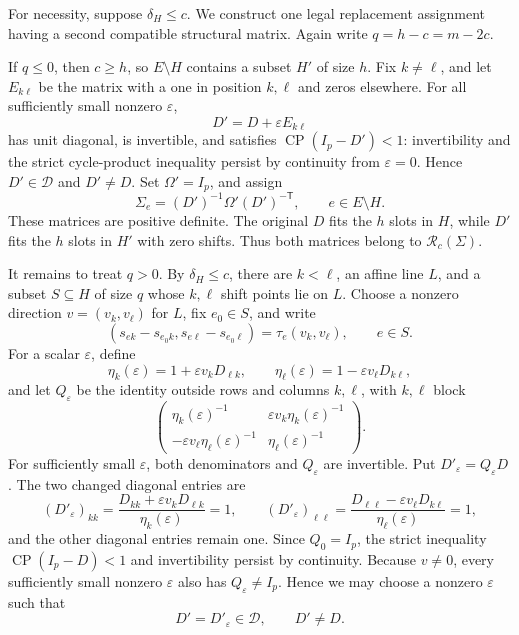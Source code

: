 For necessity, suppose \(\delta_H\le c\).  We construct one legal replacement assignment having a second compatible structural matrix.  Again write \(q=h-c=m-2c\).

If \(q\le0\), then \(c\ge h\), so \(E\setminus H\) contains a subset \(H'\) of size \(h\).  Fix \(k\ne\ell\), and let \(E_{k\ell}\) be the matrix with a one in position \(k,\ell\) and zeros elsewhere.  For all sufficiently small nonzero \(\varepsilon\),
\[
 D'=D+\varepsilon E_{k\ell}
\]
has unit diagonal, is invertible, and satisfies \(\operatorname{CP}(I_p-D')<1\): invertibility and the strict cycle-product inequality persist by continuity from \(\varepsilon=0\).  Hence \(D'\in\mathcal D\) and \(D'\ne D\).  Set \(\Omega'=I_p\), and assign
\[
 \Sigma_e=(D')^{-1}\Omega'(D')^{-\mathsf T},\qquad e\in E\setminus H.
\]
These matrices are positive definite.  The original \(D\) fits the \(h\) slots in \(H\), while \(D'\) fits the \(h\) slots in \(H'\) with zero shifts.  Thus both matrices belong to \(\mathcal R_c(\Sigma)\).

It remains to treat \(q>0\).  By \(\delta_H\le c\), there are \(k<\ell\), an affine line \(L\), and a subset \(S\subseteq H\) of size \(q\) whose \(k,\ell\) shift points lie on \(L\).  Choose a nonzero direction \(v=(v_k,v_\ell)\) for \(L\), fix \(e_0\in S\), and write
\[
 (s_{ek}-s_{e_0k},s_{e\ell}-s_{e_0\ell})=\tau_e(v_k,v_\ell),\qquad e\in S. \tag{12}
\]
For a scalar \(\varepsilon\), define
\[
 \eta_k(\varepsilon)=1+\varepsilon v_kD_{\ell k},\qquad
 \eta_\ell(\varepsilon)=1-\varepsilon v_\ell D_{k\ell},
\]
and let \(Q_\varepsilon\) be the identity outside rows and columns \(k,\ell\), with \(k,\ell\) block
\[
 \begin{pmatrix}
 \eta_k(\varepsilon)^{-1}&\varepsilon v_k\eta_k(\varepsilon)^{-1}\\
 -\varepsilon v_\ell\eta_\ell(\varepsilon)^{-1}&\eta_\ell(\varepsilon)^{-1}
 \end{pmatrix}. \tag{13}
\]
For sufficiently small \(\varepsilon\), both denominators and \(Q_\varepsilon\) are invertible.  Put \(D'_\varepsilon=Q_\varepsilon D\).  The two changed diagonal entries are
\[
 (D'_\varepsilon)_{kk}
 =\frac{D_{kk}+\varepsilon v_kD_{\ell k}}{\eta_k(\varepsilon)}=1,\qquad
 (D'_\varepsilon)_{\ell\ell}
 =\frac{D_{\ell\ell}-\varepsilon v_\ell D_{k\ell}}{\eta_\ell(\varepsilon)}=1, \tag{14}
\]
and the other diagonal entries remain one.  Since \(Q_0=I_p\), the strict inequality \(\operatorname{CP}(I_p-D)<1\) and invertibility persist by continuity.  Because \(v\ne0\), every sufficiently small nonzero \(\varepsilon\) also has \(Q_\varepsilon\ne I_p\).  Hence we may choose a nonzero \(\varepsilon\) such that
\[
 D'=D'_\varepsilon\in\mathcal D,\qquad D'\ne D. \tag{15}
\]

